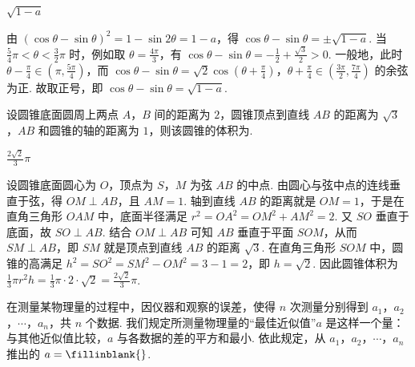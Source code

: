 \begin{answer}
\(\sqrt{1 - a}\)
\end{answer}

\begin{solution}
由 \(\left(\cos \theta - \sin \theta\right)^2 = 1 - \sin 2\theta = 1 - a\)，得 \(\cos \theta - \sin \theta = \pm\sqrt{1 - a}\). 当 \(\frac{5}{4}\pi < \theta < \frac{3}{2}\pi\) 时，例如取 \(\theta = \frac{4\pi}{3}\)，有 \(\cos \theta - \sin \theta = -\frac{1}{2} + \frac{\sqrt{3}}{2} > 0\). 一般地，此时 \(\theta - \frac{\pi}{4} \in (\pi, \frac{5\pi}{4})\)，而 \(\cos \theta - \sin \theta = \sqrt{2}\cos \left(\theta + \frac{\pi}{4}\right)\)，\(\theta + \frac{\pi}{4} \in \left(\frac{3\pi}{2}, \frac{7\pi}{4}\right)\) 的余弦为正. 故取正号，即 \(\cos \theta - \sin \theta = \sqrt{1 - a}\).
\end{solution}

\begin{problem}
设圆锥底面圆周上两点 \(A\)，\(B\) 间的距离为 \(2\)，圆锥顶点到直线 \(AB\) 的距离为 \(\sqrt{3}\)，\(AB\) 和圆锥的轴的距离为 \(1\)，则该圆锥的体积为\fillinblank{}.
\end{problem}

\begin{answer}
\(\frac{2\sqrt{2}}{3}\pi\)
\end{answer}

\begin{solution}
设圆锥底面圆心为 \(O\)，顶点为 \(S\)，\(M\) 为弦 \(AB\) 的中点. 由圆心与弦中点的连线垂直于弦，得 \(OM \perp AB\)，且 \(AM = 1\). 轴到直线 \(AB\) 的距离就是 \(OM = 1\)，于是在直角三角形 \(OAM\) 中，底面半径满足 \(r^2 = OA^2 = OM^2 + AM^2 = 2\).
又 \(SO\) 垂直于底面，故 \(SO \perp AB\). 结合 \(OM \perp AB\) 可知 \(AB\) 垂直于平面 \(SOM\)，从而 \(SM \perp AB\)，即 \(SM\) 就是顶点到直线 \(AB\) 的距离 \(\sqrt{3}\). 在直角三角形 \(SOM\) 中，圆锥的高满足 \(h^2 = SO^2 = SM^2 - OM^2 = 3 - 1 = 2\)，即 \(h = \sqrt{2}\). 因此圆锥体积为 \(\frac{1}{3}\pi r^2 h = \frac{1}{3}\pi \cdot 2 \cdot \sqrt{2} = \frac{2\sqrt{2}}{3}\pi\).
\end{solution}

\begin{problem}
在测量某物理量的过程中，因仪器和观察的误差，使得 \(n\) 次测量分别得到 \(a_1\)，\(a_2\)，\(\cdots\)，\(a_n\)，共 \(n\) 个数据. 我们规定所测量物理量的“最佳近似值”\(a\) 是这样一个量：与其他近似值比较，\(a\) 与各数据的差的平方和最小. 依此规定，从 \(a_1\)，\(a_2\)，\(\cdots\)，\(a_n\) 推出的 \(a =\fillinblank{}\).
\end{problem}

